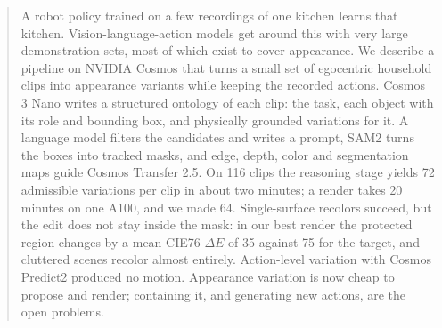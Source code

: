 \begin{abstract}
A robot policy trained on a few recordings of one kitchen learns that kitchen. Vision-language-action models get around this with very large demonstration sets, most of which exist to cover appearance. We describe a pipeline on NVIDIA Cosmos that turns a small set of egocentric household clips into appearance variants while keeping the recorded actions. Cosmos 3 Nano writes a structured ontology of each clip: the task, each object with its role and bounding box, and physically grounded variations for it. A language model filters the candidates and writes a prompt, SAM2 turns the boxes into tracked masks, and edge, depth, color and segmentation maps guide Cosmos Transfer 2.5. On 116 clips the reasoning stage yields 72 admissible variations per clip in about two minutes; a render takes 20 minutes on one A100, and we made 64. Single-surface recolors succeed, but the edit does not stay inside the mask: in our best render the protected region changes by a mean CIE76 $\Delta E$ of 35 against 75 for the target, and cluttered scenes recolor almost entirely. Action-level variation with Cosmos Predict2 produced no motion. Appearance variation is now cheap to propose and render; containing it, and generating new actions, are the open problems.

\end{abstract}
